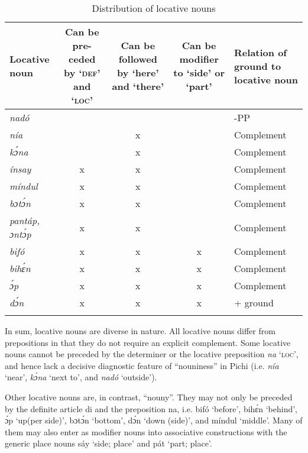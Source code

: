\begin{table}
\caption{Distribution of locative nouns}
\label{tab:key:8.3}

\begin{tabularx}{\textwidth}{QCCCQ}
\lsptoprule
Locative noun &
  \raggedright Can be pre-ceded by  ‘\textsc{def’} and  ‘\textsc{loc’} & 
  \raggedright Can be followed by  ‘here’ and  ‘there’ & 
  \raggedright Can be modifier to  ‘side’ or  ‘part’ & Relation of ground to locative noun\\
\midrule 
\itshape nadó &  &  &  & -PP\\
\itshape nía &  & x &  & Complement\\
\itshape kɔ́na &  & x &  & Complement\\
\itshape ínsay & x & x &  & Complement\\
\itshape míndul & x & x &  & Complement\\
\itshape bɔtɔ́n & x & x &  & Complement\\
\itshape pantáp, ɔntɔ́p & x & x &  & Complement\\
\itshape bifó & x & x & x & Complement\\
\itshape bihɛ́n & x & x & x & Complement\\
\itshape ɔ́p & x & x & x & Complement\\
\itshape dɔ́n & x & x & x &  + ground\\
\lspbottomrule
\end{tabularx}
\end{table}
In sum, locative nouns are diverse in nature. All locative nouns differ from prepositions in that they do not require an explicit complement. Some locative nouns cannot be preceded by the determiner or the locative preposition \textit{na} ‘\textsc{loc}’, and hence lack a decisive diagnostic feature of “nouniness” in Pichi (i.e. \textit{nía} ‘near’, \textit{kɔ́na} ‘next to’, and \textit{nadó} ‘outside’). 


Other locative nouns are, in contrast, “nouny”. They may not only be preceded by the definite article di and the preposition na, i.e. bifó ‘before’, bihɛ́n ‘behind’, ɔ́p ‘up(per side)’, bɔtɔ́n ‘bottom’, dɔ́n ‘down (side)’, and míndul ‘middle’. Many of them may also enter as modifier nouns into associative constructions with the generic place nouns sáy ‘side; place’ and pát ‘part; place’.{\fff} 



